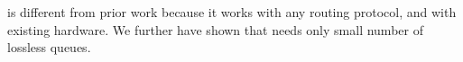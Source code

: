 
 \sysname{} is different from prior work because it works with
any routing protocol, and with existing hardware. We further have shown that
\sysname{} needs only small number of lossless queues.













%
%
%
%


